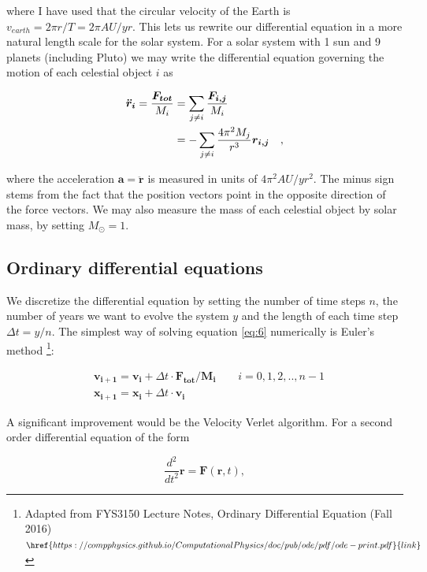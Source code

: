 \documentclass[%
 reprint,
 nobalance,
 amsmath,amssymb,
 aps,
]{revtex4-1}
\begin{document}
where I have used that the circular velocity of the Earth is $v_{earth} = 2\pi r/T = 2\pi AU/yr$. This lets us rewrite our differential equation in a more natural length scale for the solar system. For a solar system with 1 sun and 9 planets (including Pluto) we may write the differential equation governing the motion of each celestial object $i$ as

\begin{equation}{\label{eq:6}}
\begin{split}
	\bm{\ddot r_i} = \frac{\bm{F_{tot}}}{M_i}
	&= \sum_{j \neq i} \frac{\bm{F_{i,j}}}{M_i} \\
	&= -\sum_{j \neq i} \frac{4 \pi^{2} M_j}{r^{3}} \bm{r_{i,j}} \quad,
\end{split}
\end{equation}

where the acceleration $\bm{a = \ddot r}$ is measured in units of $4\pi^{2} AU/yr^{2}$. The minus sign stems from the fact that the position vectors point in the opposite direction of the force vectors. We may also measure the mass of each celestial object by solar mass, by setting $M_{\odot} = 1$. \\

\subsection{\label{sec:ODE}Ordinary differential equations}
We discretize the differential equation by setting the number of time steps $n$, the number of years we want to evolve the system $y$ and the length of each time step $\Delta t = y/n$. The simplest way of solving equation \eqref{eq:6} numerically is Euler's method \footnote{Adapted from FYS3150 Lecture Notes, Ordinary Differential Equation (Fall 2016) $\href{https://compphysics.github.io/ComputationalPhysics/doc/pub/ode/pdf/ode-print.pdf}{link}$}:

\begin{equation}
\begin{split}
	& \bm{v_{i+1} = v_i} + \Delta t \cdot \bm{F_{tot}/M_i} \qquad i=0,1,2,..,{n-1} \\
	& \bm{x_{i+1} = x_{i}} + \Delta t \cdot \bm{v_i}
\end{split}
\end{equation}

A significant improvement would be the Velocity Verlet algorithm. For a second order differential equation of the form

\begin{equation}
	\frac{d^{2}}{dt^{2}}\bm{r} = \bm{F}(\bm{r}, t),
\end{equation}
\end{document}
